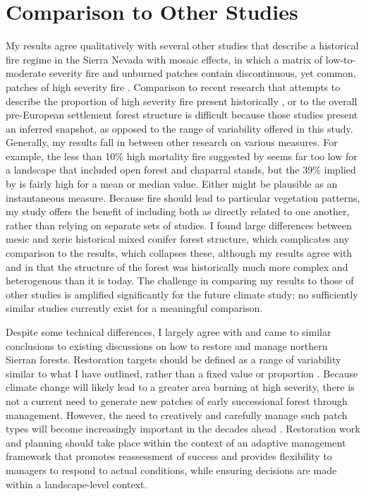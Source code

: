 
\section{Comparison to Other Studies}

My results agree qualitatively with several other studies that describe a historical fire regime in the Sierra Nevada with mosaic effects, in which a matrix of low-to-moderate severity fire and unburned patches contain discontinuous, yet common, patches of high severity fire \citep{Keeley2000,Hessburg2005,Collins2010,Baker2014}. Comparison to recent research that attempts to describe the proportion of high severity fire present historically \citep{Mallek2013}, or to the overall pre-European settlement forest structure \citep{Stephens2015,Baker2014} is difficult because those studies present an inferred snapshot, as opposed to the range of variability offered in this study. Generally, my results fall in between other research on various measures. For example, the less than 10\% high mortality fire suggested by \citet{Mallek2013} seems far too low for a landscape that included open forest and chaparral stands, but the 39\% implied by \citet{Baker2014} is fairly high for a mean or median value. Either might be plausible as an instantaneous measure. Because fire should lead to particular vegetation patterns, my study offers the benefit of including both as directly related to one another, rather than relying on separate sets of studies. I found large differences between mesic and xeric historical mixed conifer forest structure, which complicates any comparison to the \citet{Baker2014} results, which collapses these, although my results agree with \citet{Baker2014} and \citet{Collins2010} in that the structure of the forest was historically much more complex and heterogenous than it is today. The challenge in comparing my results to those of other studies is amplified significantly for the future climate study; no sufficiently similar studies currently exist for a meaningful comparison.

Despite some technical differences, I largely agree with and came to similar conclusions to existing discussions on how to restore and manage northern Sierran forests. Restoration targets should be defined as a range of variability similar to what I have outlined, rather than a fixed value or proportion \citep{Collins2011}. Because climate change will likely lead to a greater area burning at high severity, there is not a current need to generate new patches of early successional forest through management. However, the need to creatively and carefully manage such patch types will become increasingly important in the decades ahead \citep{Collins2010,Littell2012}. Restoration work and planning should take place within the context of an adaptive management framework that promotes reassessment of success and provides flexibility to managers to respond to actual conditions, while ensuring decisions are made within a landscape-level context.


